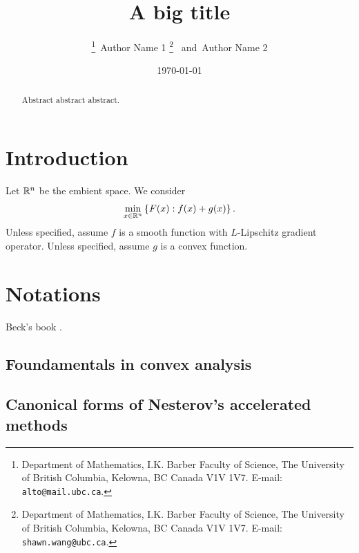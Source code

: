 \documentclass[12pt]{article}
\begin{document}
\title{
    {
        \selectfont 
        A big title
    }
    }

\author{
    \thanks{Department of Mathematics, I.K. Barber Faculty of Science,
    The University of British Columbia, Kelowna, BC Canada V1V 1V7. 
    E-mail:  \texttt{alto@mail.ubc.ca}.}~Author Name 1
    \thanks{Department of Mathematics, I.K. Barber Faculty of Science,
    The University of British Columbia, Kelowna, BC Canada V1V 1V7. 
    E-mail:  \texttt{shawn.wang@ubc.ca}.}~ and~Author Name 2
}

\date{\today}

\maketitle


\begin{abstract} 
    \noindent
    Abstract abstract abstract. 
\end{abstract}


\tableofcontents

\section{Introduction}
    Let $\mathbb R^n$ be the embient space. We consider 
    \begin{align*}
        \min_{x \in \mathbb R^n} \left\lbrace
            F(x): f(x) + g(x)
        \right\rbrace.
    \end{align*}
    Unless specified, assume $f$ is a smooth function with $L$-Lipschitz gradient operator. 
    Unless specified, assume $g$ is a convex function. 
    


\section{Notations}
    Beck's book \cite{beck_first-order_2017}. 
\subsection{Foundamentals in convex analysis}
\subsection{Canonical forms of Nesterov's accelerated methods}
\end{document}
